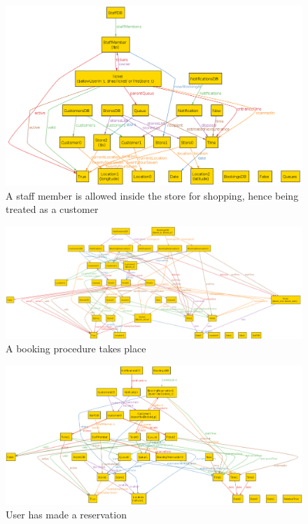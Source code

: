 \begin{figure} [H]
	\includegraphics[width=\linewidth]{../Alloy/allowedInStaff.png}
	\caption{A staff member is allowed inside the store for shopping, hence being treated as a customer}
	\label{fig:allowedInStaff}
\end{figure}

\begin{figure} [H]
	\includegraphics[width=\linewidth]{../Alloy/book.png}
	\caption{A booking procedure takes place}
	\label{fig:alloyBook}
\end{figure}

\begin{figure} [H]
	\includegraphics[width=\linewidth]{../Alloy/userHasBooked.png}
	\caption{User has made a reservation}
	\label{fig:userHasBooked}
\end{figure}

